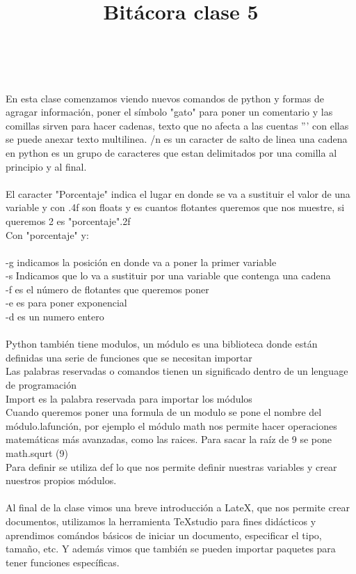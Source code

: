 \documentclass{book}
\begin{document}
	\title{\Huge Bitácora clase 5} \\
	\\
	En esta clase comenzamos viendo nuevos comandos de python y formas de agragar información, poner el símbolo "gato" para poner un comentario y las comillas sirven para hacer cadenas, texto que no afecta a las cuentas ''' con ellas se puede anexar texto multilinea. /n es un caracter de salto de linea una cadena en python es un grupo de caracteres que estan delimitados por una comilla al principio y al final.\\
	\\
	El caracter "Porcentaje" indica el lugar en donde se va a sustituir el valor de una variable y con .4f son floats y es cuantos flotantes queremos que nos muestre, si queremos 2 es "porcentaje".2f \\
	Con "porcentaje" y:\\
	\\
	-g indicamos la posición en donde va a poner la primer variable \\
	-s Indicamos que lo va a sustituir por una variable que contenga una cadena \\
	-f es el número de flotantes que queremos poner \\
	-e es para poner exponencial\\
	-d es un numero entero\\
	\\
	
	Python también tiene modulos, un módulo es una biblioteca donde están definidas una serie de funciones que se necesitan importar\\ 
	Las palabras reservadas o comandos tienen un significado dentro de un lenguage de programación \\
	Import es la palabra reservada para importar los módulos\\
	
	Cuando queremos poner una formula de un modulo se pone el nombre del módulo.lafunción, por ejemplo el módulo math nos permite hacer operaciones matemáticas más avanzadas, como las raices. Para sacar la raíz de 9 se pone\\
	math.squrt (9)\\
	
	Para definir se utiliza def lo que nos permite definir nuestras variables y crear nuestros propios módulos.\\
	\\
	Al final de la clase vimos una breve introducción a LateX, que nos permite crear documentos, utilizamos la herramienta TeXstudio para fines didácticos y aprendimos comándos básicos de iniciar un documento, especificar el tipo, tamaño, etc. Y además vimos que también se pueden importar paquetes para tener funciones específicas.
	
\end{document}
